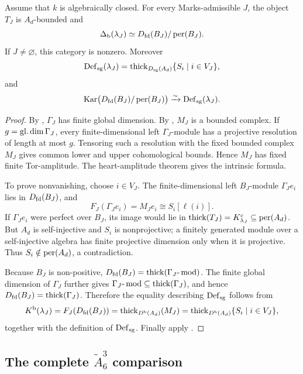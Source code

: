 \begin{theorem}\label{thm:nakayama-intrinsic}
Assume that \(k\) is algebraically closed.  For every Marks-admissible \(J\), the object \(T_J\) is \(A_d\)-bounded and
\[
 \Delta_{\mathrm b}(\lambda_J)
 \simeq
 D_{\mathrm{fd}}(B_J)/\operatorname{per}(B_J).
\]
If \(J\ne\varnothing\), this category is nonzero.  Moreover
\[
 \operatorname{Def}_{\mathrm{sg}}(\lambda_J)
 =\operatorname{thick}_{D_{\mathrm{sg}}(A_d)}\{S_i\mid i\in V_J\},
\]
and
\[
 \operatorname{Kar}\bigl(D_{\mathrm{fd}}(B_J)/\operatorname{per}(B_J)\bigr)
 \xrightarrow{\sim}
 \operatorname{Def}_{\mathrm{sg}}(\lambda_J).
\]
\end{theorem}

\begin{proof}
By , \(\Gamma_J\) has finite global dimension.  By , \(M_J\) is a bounded complex.  If \(g=\operatorname{gl.dim}\Gamma_J\), every finite-dimensional left \(\Gamma_J\)-module has a projective resolution of length at most \(g\).  Tensoring such a resolution with the fixed bounded complex \(M_J\) gives common lower and upper cohomological bounds.  Hence \(M_J\) has fixed finite Tor-amplitude.  The heart-amplitude theorem gives the intrinsic formula.

To prove nonvanishing, choose \(i\in V_J\).  The finite-dimensional left \(B_J\)-module \(\Gamma_Je_i\) lies in \(D_{\mathrm{fd}}(B_J)\), and
\[
 F_J(\Gamma_Je_i)=M_Je_i\cong S_i[\ell(i)].
\]
If \(\Gamma_Je_i\) were perfect over \(B_J\), its image would lie in
\(\operatorname{thick}(T_J)=K^c_{\lambda_J}\subseteq\operatorname{per}(A_d)\).  But \(A_d\) is self-injective and \(S_i\) is nonprojective; a finitely generated module over a self-injective algebra has finite projective dimension only when it is projective.  Thus \(S_i\notin\operatorname{per}(A_d)\), a contradiction.

Because \(B_J\) is non-positive,
\(D_{\mathrm{fd}}(B_J)=\operatorname{thick}(\Gamma_J\text{-}\operatorname{mod})\).  The finite global dimension of \(\Gamma_J\) further gives
\(\Gamma_J\text{-}\operatorname{mod}\subseteq\operatorname{thick}(\Gamma_J)\), and hence
\(D_{\mathrm{fd}}(B_J)=\operatorname{thick}(\Gamma_J)\).  Therefore the equality describing \(\operatorname{Def}_{\mathrm{sg}}\) follows from
\[
 K^{\mathrm b}(\lambda_J)=F_J(D_{\mathrm{fd}}(B_J))
 =\operatorname{thick}_{D^{\mathrm b}(A_d)}(M_J)
 =\operatorname{thick}_{D^{\mathrm b}(A_d)}\{S_i\mid i\in V_J\},
\]
together with the definition of \(\operatorname{Def}_{\mathrm{sg}}\).  Finally apply
.
\end{proof}

\subsection{The complete \texorpdfstring{\(\widetilde A^3_6\)}{A63} comparison}\label{subsec:a63}

